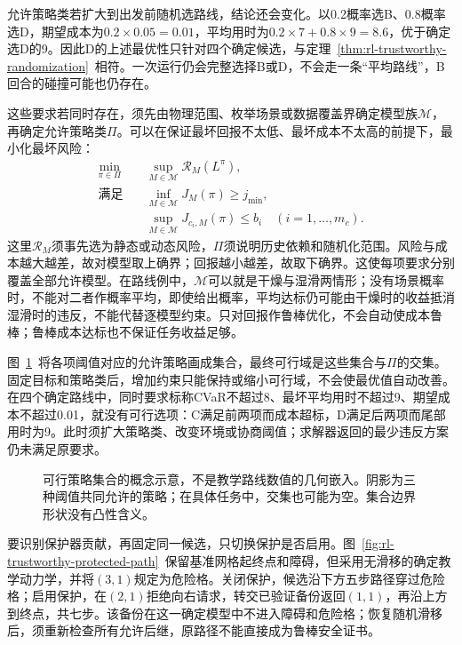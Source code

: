 允许策略类若扩大到出发前随机选路线，结论还会变化。以0.2概率选B、0.8概率选D，期望成本为$0.2\times0.05=0.01$，平均用时为$0.2\times7+0.8\times9=8.6$，优于确定选D的9。因此D的上述最优性只针对四个确定候选，与定理~\ref{thm:rl-trustworthy-randomization}~相符。一次运行仍会完整选择B或D，不会走一条“平均路线”，B回合的碰撞可能也仍存在。

这些要求若同时存在，须先由物理范围、枚举场景或数据覆盖界确定模型族$\mathcal M$，再确定允许策略类$\Pi$。可以在保证最坏回报不太低、最坏成本不太高的前提下，最小化最坏风险：
\begin{align}
  \min_{\pi\in\Pi}\quad&
      \sup_{M\in\mathcal M}\mathcal R_M(L^\pi), \nonumber\\
  \text{满足}\quad&
      \inf_{M\in\mathcal M}J_M(\pi)\geq j_{\min}, \nonumber\\
  &\sup_{M\in\mathcal M}J_{c_i,M}(\pi)\leq b_i
       \quad (i=1,\ldots,m_c).
  \label{eq:rl-trustworthy-combined-problem}
\end{align}
这里$\mathcal R_M$须事先选为静态或动态风险，$\Pi$须说明历史依赖和随机化范围。风险与成本越大越差，故对模型取上确界；回报越小越差，故取下确界。这使每项要求分别覆盖全部允许模型。在路线例中，$\mathcal M$可以就是干燥与湿滑两情形；没有场景概率时，不能对二者作概率平均，即使给出概率，平均达标仍可能由干燥时的收益抵消湿滑时的违反，不能代替逐模型约束。只对回报作鲁棒优化，不会自动使成本鲁棒；鲁棒成本达标也不保证任务收益足够。

图~\ref{fig:rl-trustworthy-intersection}~将各项阈值对应的允许策略画成集合，最终可行域是这些集合与$\Pi$的交集。固定目标和策略类后，增加约束只能保持或缩小可行域，不会使最优值自动改善。在四个确定路线中，同时要求标称CVaR不超过8、最坏平均用时不超过9、期望成本不超过0.01，就没有可行选项：C满足前两项而成本超标，D满足后两项而尾部用时为9。此时须扩大策略类、改变环境或协商阈值；求解器返回的最少违反方案仍未满足原要求。

\begin{figure}[htbp]
  \centering
  
  \caption{可行策略集合的概念示意，不是教学路线数值的几何嵌入。阴影为三种阈值共同允许的策略；在具体任务中，交集也可能为空。集合边界形状没有凸性含义。}
  \label{fig:rl-trustworthy-intersection}
\end{figure}

要识别保护器贡献，再固定同一候选，只切换保护是否启用。图~\ref{fig:rl-trustworthy-protected-path}~保留基准网格起终点和障碍，但采用无滑移的确定教学动力学，并将$(3,1)$规定为危险格。关闭保护，候选沿下方五步路径穿过危险格；启用保护，在$(2,1)$拒绝向右请求，转交已验证备份返回$(1,1)$，再沿上方到终点，共七步。该备份在这一确定模型中不进入障碍和危险格；恢复随机滑移后，须重新检查所有允许后继，原路径不能直接成为鲁棒安全证书。

